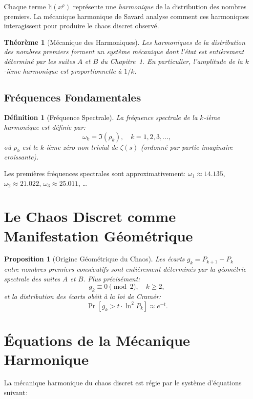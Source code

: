 \documentclass[12pt,a4paper]{article}
\newtheorem{theoreme}{Théorème}
\newtheorem{proposition}{Proposition}
\newtheorem{definition}{Définition}
\begin{document}
Chaque terme $\mathrm{li}(x^\rho)$ représente une \emph{harmonique} de la distribution
des nombres premiers. La mécanique harmonique de Savard analyse comment ces harmoniques
interagissent pour produire le chaos discret observé.

\begin{theoreme}[Mécanique des Harmoniques]
Les harmoniques de la distribution des nombres premiers forment un système mécanique
dont l'état est entièrement déterminé par les suites $A$ et $B$ du Chapitre~1.
En particulier, l'amplitude de la $k$-ième harmonique est proportionnelle à $1/k$.
\end{theoreme}

\subsection{Fréquences Fondamentales}

\begin{definition}[Fréquence Spectrale]
La \emph{fréquence spectrale} de la $k$-ième harmonique est définie par:
\[
  \omega_k = \Im(\rho_k), \quad k = 1, 2, 3, \ldots,
\]
où $\rho_k$ est le $k$-ième zéro non trivial de $\zeta(s)$ (ordonné par partie
imaginaire croissante).
\end{definition}

Les premières fréquences spectrales sont approximativement:
$\omega_1 \approx 14.135$, $\omega_2 \approx 21.022$, $\omega_3 \approx 25.011$, \ldots

\section{Le Chaos Discret comme Manifestation Géométrique}

\begin{proposition}[Origine Géométrique du Chaos]
Les écarts $g_k = P_{k+1} - P_k$ entre nombres premiers consécutifs sont entièrement
déterminés par la géométrie spectrale des suites $A$ et $B$. Plus précisément:
\[
  g_k \equiv 0 \pmod{2}, \quad k \geq 2,
\]
et la distribution des écarts obéit à la loi de Cramér:
\[
  \Pr[g_k > t \cdot \ln^2 P_k] \approx e^{-t}.
\]
\end{proposition}

\section{Équations de la Mécanique Harmonique}

La mécanique harmonique du chaos discret est régie par le système d'équations suivant:
\end{document}
